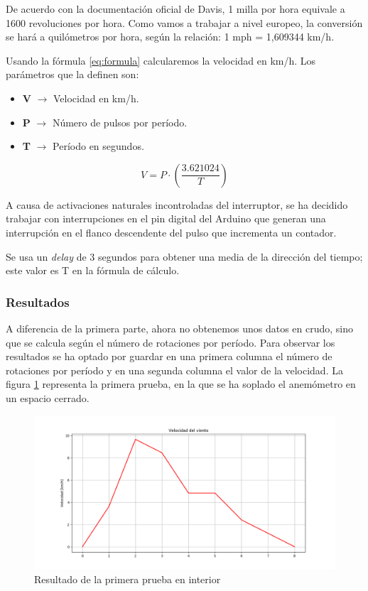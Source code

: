 \documentclass[a4paper, 11pt]{article}
\begin{document}
De acuerdo con la documentación oficial de Davis, 1 milla por hora equivale a 1600 revoluciones por hora. Como vamos a trabajar a nivel europeo, la conversión se hará a quilómetros por hora, según la relación: 1 mph = 1,609344 km/h.

Usando la fórmula \ref{eq:formula} calcularemos la velocidad en km/h. Los parámetros que la definen son:

\begin{itemize}
	\item \textbf{V} $\rightarrow$ Velocidad en km/h.
	\item \textbf{P} $\rightarrow$ Número de pulsos por período.
	\item \textbf{T} $\rightarrow$ Período en segundos. 
\end{itemize}

\begin{equation} 
V = P \cdot \left(\frac{3.621024}{T}\right)
\label{eq:formula}
\end{equation}

A causa de activaciones naturales incontroladas del interruptor, se ha decidido trabajar con interrupciones en el pin digital del Arduino que generan una interrupción en el flanco descendente del pulso que incrementa un contador.

Se usa un \textit{delay} de 3 segundos para obtener una media de la dirección del tiempo; este valor es T en la fórmula de cálculo. 

\subsubsection{Resultados}
A diferencia de la primera parte, ahora no obtenemos unos datos en crudo, sino que se calcula según el número de rotaciones por período. Para observar los resultados se ha optado por guardar en una primera columna el número de rotaciones por período y en una segunda columna el valor de la velocidad. La figura \ref{fig:testvelocity1} representa la primera prueba, en la que se ha soplado el anemómetro en un espacio cerrado.

\begin{figure}[h]
	\center
	\includegraphics[width=1\textwidth]{img/testVelocityIn.png}
	\caption{Resultado de la primera prueba en interior}
	\label{fig:testvelocity1}
\end{figure}
\newpage
\end{document}
